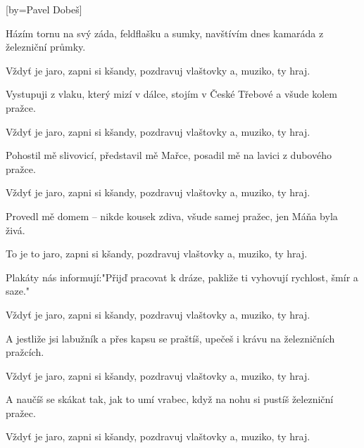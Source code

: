 [by={Pavel Dobeš}]

\beginverse{}
Házím tornu na svý záda, feldflašku a sumky,
navštívím dnes kamaráda z železniční průmky.
\endverse{}

\beginchorus{}
Vždyť je jaro, zapni si kšandy,
pozdravuj vlaštovky a, muziko, ty hraj.
\endchorus{}

\beginverse{}
Vystupuji z vlaku, který mizí v dálce,
stojím v České Třebové a všude kolem pražce.
\endverse{}

\repeatingchorus{}
\beginchorus{}
Vždyť je jaro, zapni si kšandy,
pozdravuj vlaštovky a, muziko, ty hraj.
\endchorus{}

\beginverse{}
Pohostil mě slivovicí, představil mě Mařce,
posadil mě na lavici z dubového pražce.
\endverse{}

\repeatingchorus{}
\beginchorus{}
Vždyť je jaro, zapni si kšandy,
pozdravuj vlaštovky a, muziko, ty hraj.
\endchorus{}

\beginverse{}
Provedl mě domem -- nikde kousek zdiva,
všude samej pražec, jen Máňa byla živá.
\endverse{}

\beginchorus{}
To je to jaro, zapni si kšandy,
pozdravuj vlaštovky a, muziko, ty hraj.
\endchorus{}

\beginverse{}
Plakáty nás informují:"Přijď pracovat k dráze,
pakliže ti vyhovují rychlost, šmír a saze."
\endverse{}

\repeatingchorus{}
\beginchorus{}
Vždyť je jaro, zapni si kšandy,
pozdravuj vlaštovky a, muziko, ty hraj.
\endchorus{}

\beginverse{}
A jestliže jsi labužník a přes kapsu se praštíš,
upečeš i krávu na železničních pražcích.
\endverse{}

\repeatingchorus{}
\beginchorus{}
Vždyť je jaro, zapni si kšandy,
pozdravuj vlaštovky a, muziko, ty hraj.
\endchorus{}

\beginverse{}
A naučíš se skákat tak, jak to umí vrabec,
když na nohu si pustíš železniční pražec.
\endverse{}

\repeatingchorus{}
\beginchorus{}
Vždyť je jaro, zapni si kšandy,
pozdravuj vlaštovky a, muziko, ty hraj.
\endchorus{}

